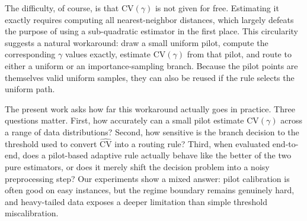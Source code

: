 \documentclass[conference]{IEEEtran}
\begin{document}
The difficulty, of course, is that $\mathrm{CV}(\gamma)$ is not given
for free. Estimating it exactly requires computing all nearest-neighbor
distances, which largely defeats the purpose of using a sub-quadratic
estimator in the first place. This circularity suggests a natural
workaround: draw a small uniform pilot, compute the corresponding
$\gamma$ values exactly, estimate $\mathrm{CV}(\gamma)$ from that
pilot, and route to either a uniform or an importance-sampling branch.
Because the pilot points are themselves valid uniform samples, they can
also be reused if the rule selects the uniform path.

The present work asks how far this workaround actually goes in
practice. Three questions matter. First, how accurately can a small
pilot estimate $\mathrm{CV}(\gamma)$ across a range of data
distributions? Second, how sensitive is the branch decision to the
threshold used to convert $\widehat{\mathrm{CV}}$ into a routing rule?
Third, when evaluated end-to-end, does a pilot-based adaptive rule
actually behave like the better of the two pure estimators, or does it
merely shift the decision problem into a noisy preprocessing step? Our
experiments show a mixed answer: pilot calibration is often good on
easy instances, but the regime boundary remains genuinely hard, and
heavy-tailed data exposes a deeper limitation than simple threshold
miscalibration.
\end{document}
